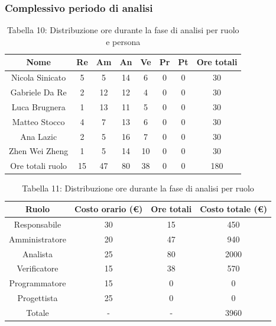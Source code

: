 \subsubsection{Complessivo periodo di analisi}
%
\begin{table}[h]
	\setlength\extrarowheight{5pt}
	\centering
	\begin{tabularx}{\textwidth}{|ccccccc|c|}
		\hline
		\rowcolor{white}
		\textbf{Nome} & \textbf{Re} & \textbf{Am} & \textbf{An} & \textbf{Ve} & \textbf{Pr}& \textbf{Pt} & \textbf{Ore totali} \\
		\hline
		Nicola Sinicato &5&5&14&6&0&0&30 \\
		Gabriele Da Re &2&12&12&4&0&0&30 \\
		Luca Brugnera &1&13&11&5&0&0&30 \\
		Matteo Stocco &4&7&13&6&0&0&30 \\
		Ana Lazic &2&5&16&7&0&0&30 \\
		Zhen Wei Zheng &1&5&14&10&0&0&30 \\
		\hline
		Ore totali ruolo &15&47&80&38&0&0&180 \\
		\hline
	\end{tabularx}
	\vspace{10pt}
	\caption{Tabella 10: Distribuzione ore durante la fase di analisi per ruolo e persona}
\end{table}
\begin{table}[h]
	\setlength\extrarowheight{5pt}
	\centering
	\begin{tabularx}{\textwidth}{|ccc|c|}
		\hline
		\rowcolor{white}
		\textbf{Ruolo} & \textbf{Costo orario (€)} & \textbf{Ore totali} & \textbf{Costo totale (€)} \\
		\hline
		Responsabile &30&15&450 \\
		Amministratore &20&47&940 \\
		Analista &25&80&2000 \\
		Verificatore &15&38&570 \\
		Programmatore &15&0&0 \\
		Progettista &25&0&0 \\
		\hline
		Totale &-&-&3960 \\
		\hline
	\end{tabularx}
    \vspace{10pt}
	\caption{Tabella 11: Distribuzione ore durante la fase di analisi per ruolo}
\end{table}
